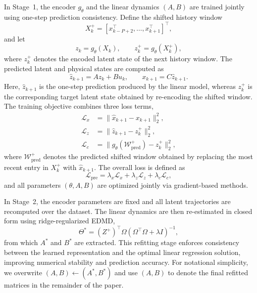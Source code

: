 \documentclass[journal]{IEEEtran}
\begin{document}
In Stage~1, the encoder $g_\theta$ and the linear dynamics $(A,B)$ are trained jointly using one-step prediction consistency. Define the shifted history window
\begin{equation}
    X_k^{+} = [x_{k-P+2}^\top,\ldots,x_{k+1}^\top]^\top,
\end{equation}
and let
\begin{equation}
    z_k = g_\theta(X_k), \qquad
    z_k^{+} = g_\theta(X_k^{+}),
\end{equation}
where $z_k^{+}$ denotes the encoded latent state of the next history window. The predicted latent and physical states are computed as
\begin{equation}
    \hat{z}_{k+1} = A z_k + B u_k,
    \qquad
    \hat{x}_{k+1} = C \hat{z}_{k+1}.
\end{equation}
Here, $\hat{z}_{k+1}$ is the one-step prediction produced by the linear model, whereas $z_k^{+}$ is the corresponding target latent state obtained by re-encoding the shifted window. The training objective combines three loss terms,
\begin{align}
    \mathcal{L}_{x} &= \|\hat{x}_{k+1}-x_{k+1}\|_2^2, \label{eq:loss_x}\\
    \mathcal{L}_{z} &= \|\hat{z}_{k+1}-z_k^{+}\|_2^2, \label{eq:loss_z}\\
    \mathcal{L}_{c} &= \bigl\|g_\theta(\mathcal{W}^{+}_{\mathrm{pred}})-z_k^{+}\bigr\|_2^2, \label{eq:loss_c}
\end{align}
where $\mathcal{W}^{+}_{\mathrm{pred}}$ denotes the predicted shifted window obtained by replacing the most recent entry in $X_k^{+}$ with $\hat{x}_{k+1}$. The overall loss is defined as
\begin{equation}
    \mathcal{L}_{\mathrm{pre}} = \lambda_x \mathcal{L}_x + \lambda_z \mathcal{L}_z + \lambda_c \mathcal{L}_c,
    \label{eq:pretraining_loss}
\end{equation}
and all parameters $(\theta, A, B)$ are optimized jointly via gradient-based methods.

In Stage~2, the encoder parameters are fixed and all latent trajectories are recomputed over the dataset. The linear dynamics are then re-estimated in closed form using ridge-regularized EDMD,
\begin{equation}
    \Theta^{*} = (Z^{+})^\top \Omega \left(\Omega^\top \Omega + \lambda I\right)^{-1},
\end{equation}
from which $A^{*}$ and $B^{*}$ are extracted. This refitting stage enforces consistency between the learned representation and the optimal linear regression solution, improving numerical stability and prediction accuracy. For notational simplicity, we overwrite $(A,B)\leftarrow(A^{*},B^{*})$ and use $(A,B)$ to denote the final refitted matrices in the remainder of the paper.
\end{document}
